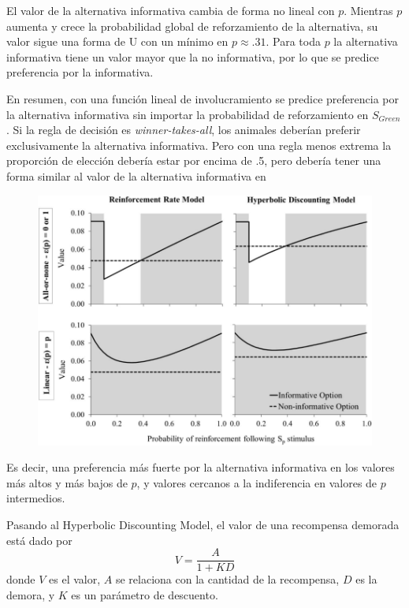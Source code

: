 \documentclass[a4paper,12pt]{article}
\begin{document}
El valor de la alternativa informativa cambia de forma no lineal con $p$. Mientras $p$ aumenta y crece la probabilidad global de reforzamiento de la alternativa, su valor sigue una forma de U con un mínimo en $p\approx {.}31$. Para toda $p$ la alternativa informativa tiene un valor mayor que la no informativa, por lo que se predice preferencia por la informativa.

En resumen, con una función lineal de involucramiento se predice preferencia por la alternativa informativa sin importar la probabilidad de reforzamiento en $S_{Green}$. Si la regla de decisión es {\itshape winner-takes-all}, los animales deberían preferir exclusivamente la alternativa informativa. Pero con una regla menos extrema la proporción de elección debería estar por encima de .5, pero debería tener una forma similar al valor de la alternativa informativa en

\begin{figure}[ht]
	\begin{center}
		\includegraphics[scale=0.4]{Fortes2018(3).png}
	\end{center}
\end{figure}

Es decir, una preferencia más fuerte por la alternativa informativa en los valores más altos y más bajos de $p$, y valores cercanos a la indiferencia en valores de $p$ intermedios.

\newpage
Pasando al Hyperbolic Discounting Model, el valor de una recompensa demorada está dado por 
$$
V=\frac{A}{1+KD}
$$
donde $V$ es el valor, $A$ se relaciona con la cantidad de la recompensa, $D$ es la demora, y $K$ es un parámetro de descuento.
\end{document}
